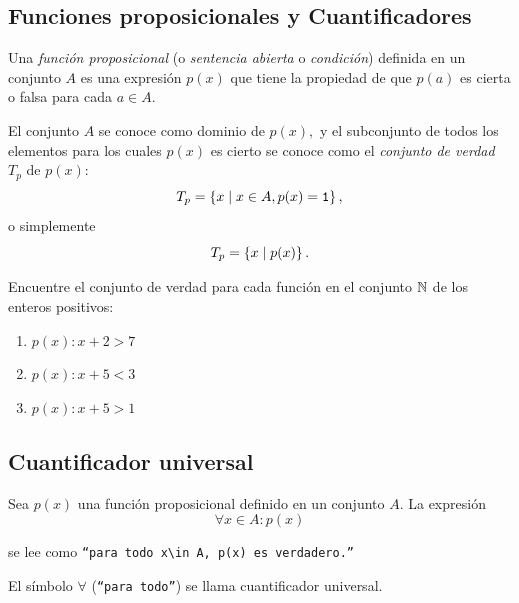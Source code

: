 \documentclass[xcolor={svgnames},
  hyperref={colorlinks}, 
  spanish, 12pt]{beamer}
\numberwithin{equation}{section} %
\numberwithin{figure}{section} %
\begin{document}
\subsection{Funciones proposicionales y Cuantificadores}

\begin{frame}
 Una \emph{funci\'on proposicional} (o \emph{sentencia abierta} o \emph{condici\'on}) definida en un conjunto $A$ es una expresi\'on $p(x)$ que tiene la propiedad de que $p(a)$ es cierta o falsa para cada $a \in A.$
\end{frame}

\begin{frame}
 El conjunto $A$ se conoce como dominio de $p(x),$ y el subconjunto de todos los elementos para los cuales $p(x)$ es cierto se conoce como el \emph{conjunto de verdad} $T_{p}$ de $p(x):$
 \pause
 $$T_{p}=\left\{ x \mid x\in A, p(x)=\texttt{1} \right\},$$ \pause
 o simplemente 
 $$
 T_{p}=\left\{ x \mid p(x) \right\}.
 $$
\end{frame}

\begin{frame}
 \begin{exmp}
  \label{lip:exmp:4.7}
  Encuentre el conjunto de verdad para cada funci\'on en el conjunto $\mathbb{N}$ de los enteros positivos:
  \begin{enumerate}
   \item $p(x): x+2>7$ \pause
   \item $p(x): x+5<3$ \pause
   \item $p(x): x+5>1$ 
  \end{enumerate}

 \end{exmp}

\end{frame}

\subsection{Cuantificador universal}

\begin{frame}
 Sea $p(x)$ una funci\'on proposicional definido en un conjunto $A.$ La expresi\'on
 \begin{equation}
 \label{lip:4.1}
   \forall x \in A: p(x)
 \end{equation}

 
 se lee como  \texttt{``para todo $x\in A,$ $p(x)$ es verdadero.''}  \pause
 
 El s\'imbolo $\forall$ (\texttt{``para todo''}) se llama cuantificador universal.
\end{frame}
\end{document}
